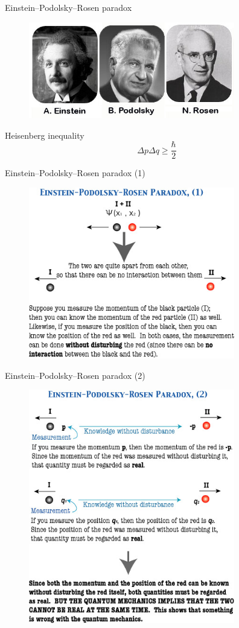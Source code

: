 \documentclass[10pt,pdf,hyperref={unicode}]{beamer}
\begin{document}
\begin{frame}{Einstein–Podolsky–Rosen paradox}
 \begin{figure} 
   \includegraphics[width=90mm,scale=0.5]{epr.jpg}
  \end{figure}
\end{frame}

\begin{frame}{Heisenberg inequality}
  \[
  \Delta p \Delta q \ge \frac{\hbar}{2}
  \]
\end{frame}

\begin{frame}{Einstein–Podolsky–Rosen paradox (1)}
 \begin{figure} 
   \includegraphics[width=90mm,scale=0.5]{epr1.jpg}
  \end{figure}
\end{frame}

\begin{frame}{Einstein–Podolsky–Rosen paradox (2)}
 \begin{figure} 
   \includegraphics[width=90mm,scale=0.5]{epr2.jpg}
  \end{figure}
\end{frame}
\end{document}
